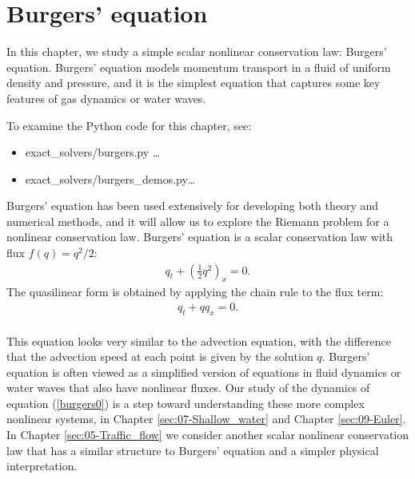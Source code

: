 \documentclass{SIAMbook2016}
\providecommand{\tightlist}{%
      \setlength{\itemsep}{0pt}\setlength{\parskip}{0pt}}
\begin{document}
\hypertarget{burgers-equation}{%
\chapter{Burgers' equation}\label{burgers-equation}}
\label{sec:04-Burgers}
In this chapter, we study a simple scalar nonlinear conservation law:
Burgers' equation. Burgers' equation models momentum transport in a
fluid of uniform density and pressure, and it is the simplest equation
that captures some key features of gas dynamics or water waves.

To examine the Python code for this chapter, see:

\begin{itemize}
\tightlist
\item
  {exact\_solvers/burgers.py} \ldots{}
\item
  {exact\_solvers/burgers\_demos.py}\ldots{}
\end{itemize}

Burgers' equation has been used extensively for developing both theory
and numerical methods, and it will allow us to explore the Riemann
problem for a nonlinear conservation law. Burgers' equation is a scalar
conservation law with flux \(f(q)=q^2/2\): \begin{align}
q_t + \left(\frac{1}{2}q^2\right)_x = 0.
\label{burgers0}
\end{align} The quasilinear form is obtained by applying the chain rule
to the flux term:\\
\begin{align*}
q_t + qq_x = 0.
\end{align*}\\
This equation looks very similar to the advection equation, with the
difference that the advection speed at each point is given by the
solution \(q\). Burgers' equation is often viewed as a simplified
version of equations in fluid dynamics or water waves that also have
nonlinear fluxes. Our study of the dynamics of equation (\ref{burgers0})
is a step toward understanding these more complex nonlinear systems, in
Chapter \ref{sec:07-Shallow_water} and Chapter \ref{sec:09-Euler}. In
Chapter \ref{sec:05-Traffic_flow} we consider another scalar nonlinear
conservation law that has a similar structure to Burgers' equation and a
simpler physical interpretation.
\end{document}
